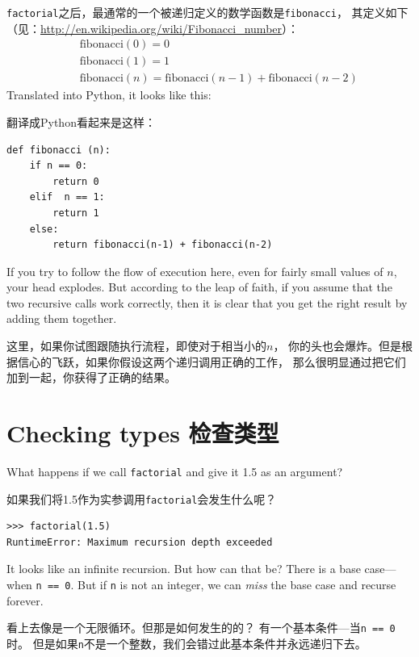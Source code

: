 \documentclass[10pt]{book}
\begin{document}
\begin{CJK}{UTF8}{gbsn}
{\tt factorial}之后，最通常的一个被递归定义的数学函数是{\tt fibonacci}，
其定义如下（见：\url{http://en.wikipedia.org/wiki/Fibonacci_number}）：
%
\begin{eqnarray*}
&& \mathrm{fibonacci}(0) = 0 \\
&& \mathrm{fibonacci}(1) = 1 \\
&& \mathrm{fibonacci}(n) = \mathrm{fibonacci}(n-1) + \mathrm{fibonacci}(n-2)
\end{eqnarray*}
%
Translated into Python, it looks like this:

翻译成Python看起来是这样：

\begin{verbatim}
def fibonacci (n):
    if n == 0:
        return 0
    elif  n == 1:
        return 1
    else:
        return fibonacci(n-1) + fibonacci(n-2)
\end{verbatim}
%
If you try to follow the flow of execution here, even for fairly
small values of $n$, your head explodes.  But according to the
leap of faith, if you assume that the two recursive calls
work correctly, then it is clear that you get
the right result by adding them together.

这里，如果你试图跟随执行流程，即使对于相当小的$n$，
你的头也会爆炸。但是根据信心的飞跃，如果你假设这两个递归调用正确的工作，
那么很明显通过把它们加到一起，你获得了正确的结果。


\section{Checking types 检查类型}
\label{guardian}

What happens if we call {\tt factorial} and give it 1.5 as an argument?

如果我们将1.5作为实参调用{\tt factorial}会发生什么呢？

\begin{verbatim}
>>> factorial(1.5)
RuntimeError: Maximum recursion depth exceeded
\end{verbatim}
%
It looks like an infinite recursion.  But how can that be?  There is a
base case---when {\tt n == 0}.  But if {\tt n} is not an integer,
we can {\em miss} the base case and recurse forever.

看上去像是一个无限循环。但那是如何发生的的？
有一个基本条件---当{\tt n == 0}时。
但是如果{\tt n}不是一个整数，我们会错过此基本条件并永远递归下去。


\end{CJK}
\end{document}

